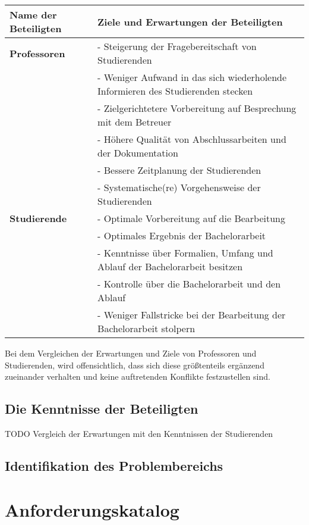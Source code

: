 \documentclass{scrreprt}
\begin{document}
\begin{tabularx}{\textwidth}{l|X}
	\hline
	\textbf{Name der Beteiligten} & \textbf{Ziele und Erwartungen der Beteiligten} \\ \hline
	\textbf{Professoren} 
	& - Steigerung der Fragebereitschaft von Studierenden\\
	& - Weniger Aufwand in das sich wiederholende Informieren des Studierenden stecken\\
	& - Zielgerichtetere Vorbereitung auf Besprechung mit dem Betreuer\\
	& - Höhere Qualität von Abschlussarbeiten und der Dokumentation\\
	& - Bessere Zeitplanung der Studierenden\\ 
	& - Systematische(re) Vorgehensweise der Studierenden\\ \hline
	\textbf{Studierende} 
	& - Optimale Vorbereitung auf die Bearbeitung\\
	& - Optimales Ergebnis der Bachelorarbeit\\
	& - Kenntnisse über Formalien, Umfang und Ablauf der Bachelorarbeit besitzen\\
	& - Kontrolle über die Bachelorarbeit und den Ablauf\\
	& - Weniger Fallstricke bei der Bearbeitung der Bachelorarbeit stolpern\\ \hline
\end{tabularx}
\label{tab:zieleBeteiligte}
\par Bei dem Vergleichen der Erwartungen und Ziele von Professoren und Studierenden, wird offensichtlich, dass sich diese größtenteils ergänzend zueinander verhalten und keine auftretenden Konflikte festzustellen sind.
\par 

\subsection{Die Kenntnisse der Beteiligten}
TODO
Vergleich der Erwartungen mit den Kenntnissen der Studierenden

\subsection{Identifikation des Problembereichs}

\section{Anforderungskatalog}\label{sec:anforderungskatalog}
\end{document}
